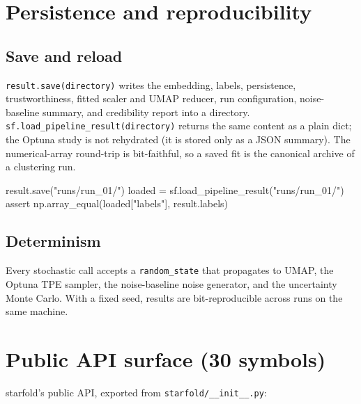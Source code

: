 \documentclass[11pt,a4paper]{article}
\begin{document}
\section{Persistence and reproducibility}

\subsection{Save and reload}

\texttt{result.save(directory)} writes the embedding, labels, persistence, trustworthiness, fitted scaler and UMAP reducer, run configuration, noise-baseline summary, and credibility report into a directory. \texttt{sf.load\_pipeline\_result(directory)} returns the same content as a plain dict; the Optuna study is not rehydrated (it is stored only as a JSON summary). The numerical-array round-trip is bit-faithful, so a saved fit is the canonical archive of a clustering run.

\begin{pycode}
result.save("runs/run_01/")
loaded = sf.load_pipeline_result("runs/run_01/")
assert np.array_equal(loaded["labels"], result.labels)
\end{pycode}

\subsection{Determinism}

Every stochastic call accepts a \texttt{random\_state} that propagates to UMAP, the Optuna TPE sampler, the noise-baseline noise generator, and the uncertainty Monte Carlo. With a fixed seed, results are bit-reproducible across runs on the same machine.

\section{Public API surface (30 symbols)}
\label{sec:api}

\textsf{starfold}'s public API, exported from \texttt{starfold/\_\_init\_\_.py}:
\end{document}
